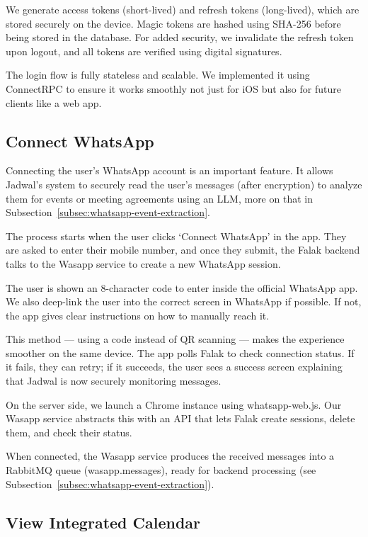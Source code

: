 We generate access tokens (short-lived) and refresh tokens (long-lived), which are stored securely on the device. Magic tokens are hashed using SHA-256 before being stored in the database. For added security, we invalidate the refresh token upon logout, and all tokens are verified using digital signatures.

The login flow is fully stateless and scalable. We implemented it using ConnectRPC to ensure it works smoothly not just for iOS but also for future clients like a web app.

\subsection{Connect WhatsApp}

Connecting the user's WhatsApp account is an important feature. It allows Jadwal's system to securely read the user's messages (after encryption) to analyze them for events or meeting agreements using an LLM, more on that in Subsection~\ref{subsec:whatsapp-event-extraction}.

The process starts when the user clicks `Connect WhatsApp' in the app. They are asked to enter their mobile number, and once they submit, the Falak backend talks to the Wasapp service to create a new WhatsApp session.

The user is shown an 8-character code to enter inside the official WhatsApp app. We also deep-link the user into the correct screen in WhatsApp if possible. If not, the app gives clear instructions on how to manually reach it.

This method — using a code instead of QR scanning — makes the experience smoother on the same device. The app polls Falak to check connection status. If it fails, they can retry; if it succeeds, the user sees a success screen explaining that Jadwal is now securely monitoring messages.

On the server side, we launch a Chrome instance using whatsapp-web.js. Our Wasapp service abstracts this with an API that lets Falak create sessions, delete them, and check their status.

When connected, the Wasapp service produces the received messages into a RabbitMQ queue (wasapp.messages), ready for backend processing (see Subsection~\ref{subsec:whatsapp-event-extraction}).

\subsection{View Integrated Calendar}

